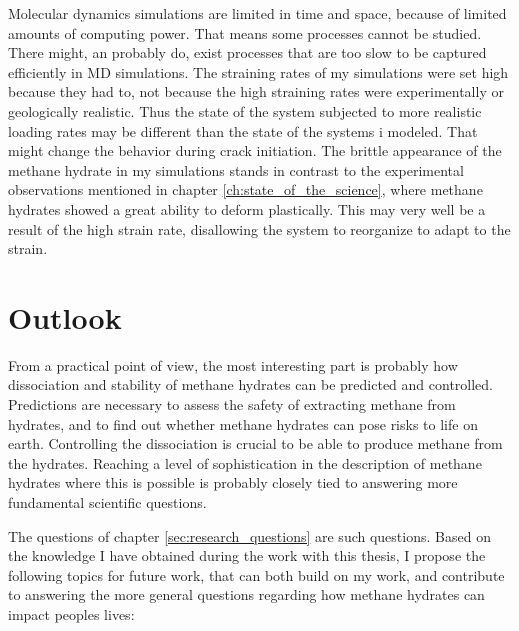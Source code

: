 Molecular dynamics simulations are limited in time and space, because of limited amounts of computing power. That means some processes cannot be studied. There might, an probably do, exist processes that are too slow to be captured efficiently in MD simulations. The straining rates of my simulations were set high because they had to, not because the high straining rates were experimentally or geologically realistic. Thus the state of the system subjected to more realistic loading rates may be different than the state of the systems i modeled. That might change the behavior during crack initiation. The brittle appearance of the methane hydrate in my simulations stands in contrast to the experimental observations mentioned in chapter \ref{ch:state_of_the_science}, where methane hydrates showed a great ability to deform plastically. This may very well be a result of the high strain rate, disallowing the system to reorganize to adapt to the strain.


\section{Outlook}

From a practical point of view, the most interesting part is probably how dissociation and stability of methane hydrates can be predicted and controlled. Predictions are necessary to assess the safety of extracting methane from hydrates, and to find out whether methane hydrates can pose risks to life on earth. Controlling the dissociation is crucial to be able to produce methane from the hydrates. Reaching a level of sophistication in the description of methane hydrates where this is possible is probably closely tied to answering more fundamental scientific questions. 

The questions of chapter \ref{sec:research_questions} are such questions. Based on the knowledge I have obtained during the work with this thesis, I propose the following topics for future work, that can both build on my work, and contribute to answering the more general questions regarding how methane hydrates can impact peoples lives:


